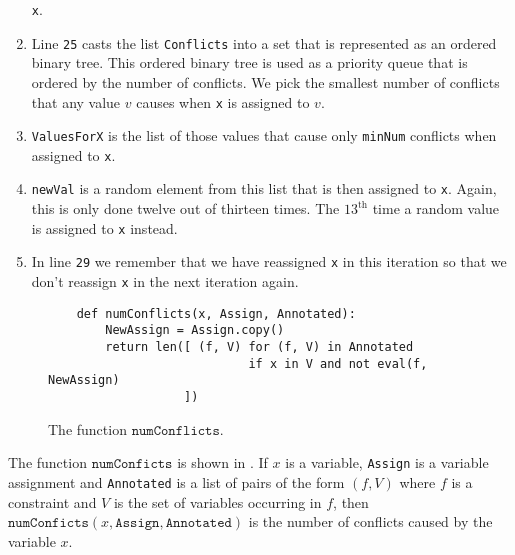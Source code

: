 \begin{enumerate}
      \texttt{x}.
\item Line \texttt{25} casts the list \texttt{Conflicts} into a set that is represented as an ordered binary tree.
      This ordered binary tree is used as a priority queue that is ordered by the number of conflicts.  We pick the
      smallest number of conflicts that any value $v$ causes when \texttt{x} is assigned to $v$.
\item \texttt{ValuesForX} is the list of those values that cause only \texttt{minNum} conflicts when assigned
      to \texttt{x}. 
\item \texttt{newVal} is a random element from this list that is then assigned to \texttt{x}.
      Again, this is only done twelve out of thirteen times.  The $13^\mathrm{th}$ time a random value is
      assigned to \texttt{x} instead. 
\item In line \texttt{29} we remember that we have reassigned \texttt{x} in this iteration so that we don't reassign
      \texttt{x} in the next iteration again.
\end{enumerate}

\begin{figure}[!ht]
\centering
\begin{verbatim}
    def numConflicts(x, Assign, Annotated):
        NewAssign = Assign.copy()
        return len([ (f, V) for (f, V) in Annotated 
                            if x in V and not eval(f, NewAssign) 
                   ])
\end{verbatim}
\vspace*{-0.3cm}
\caption{The function $\texttt{numConflicts}$.}
\label{fig:Local-Search.ipynb:numConflicts}
\end{figure}

The function $\texttt{numConficts}$ is shown in .  If $x$ is a variable,
\texttt{Assign} is a variable assignment and \texttt{Annotated} is a list of pairs of the form $(f, V)$ where
$f$ is a constraint and $V$ is the set of variables occurring in $f$, then 
$\texttt{numConficts}(x,\texttt{Assign}, \texttt{Annotated})$
is the number of conflicts caused by the variable $x$.


